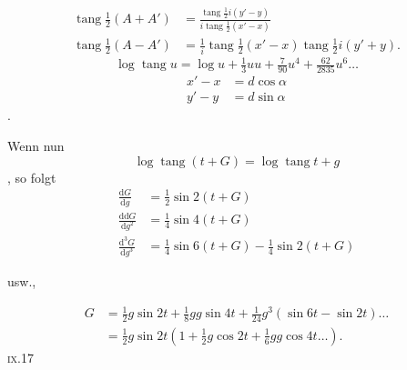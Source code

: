 \[
\begin{aligned}
\operatorname{tang}\tfrac12(A+A')&=
\frac{\operatorname{tang}\tfrac12 i(y'-y)}{i\operatorname{tang}\tfrac12(x'-x)}\\
\operatorname{tang}\tfrac12(A-A')&=\frac1i\operatorname{tang}\tfrac12(x'-x)
 \operatorname{tang}\tfrac12 i(y'+y).
\end{aligned}
\]
\noindent [Da]
\[
\log\operatorname{tang}u=\log u+\tfrac13uu+\tfrac7{90}u^4+\tfrac{62}{2835}u^6\ldots
\]
\[
\begin{aligned}
x'-x&=d\cos\alpha\\
y'-y&=d\sin\alpha
\end{aligned}
\]
.

Wenn nun
\[
\log\operatorname{tang}(t+G)=\log\operatorname{tang}t+g
\]
\noindent [gilt], so folgt
\[
\begin{aligned}
\frac{\mathrm dG}{\mathrm dg}&=\tfrac12\sin2(t+G)\\
\frac{\mathrm d\mathrm dG}{\mathrm dg^2}&=\tfrac14\sin4(t+G)\\
\frac{\mathrm d^3G}{\mathrm dg^3}&=\tfrac14\sin6(t+G)-\tfrac14\sin2(t+G)
\end{aligned}
\]
\centerline{usw.,}
\medskip
\noindent [folglich]
\[
\begin{aligned}
G&=\tfrac12g\sin2t+\tfrac18gg\sin4t+\tfrac1{24}g^3(\sin6t-\sin2t)\ldots\\
 &=\tfrac12g\sin2t(1+\tfrac12g\cos2t+\tfrac16gg\cos4t\ldots).
\end{aligned}
\]
\noindent\textsc{ix.}\hfill 17\hspace*{.13\linewidth}\par

